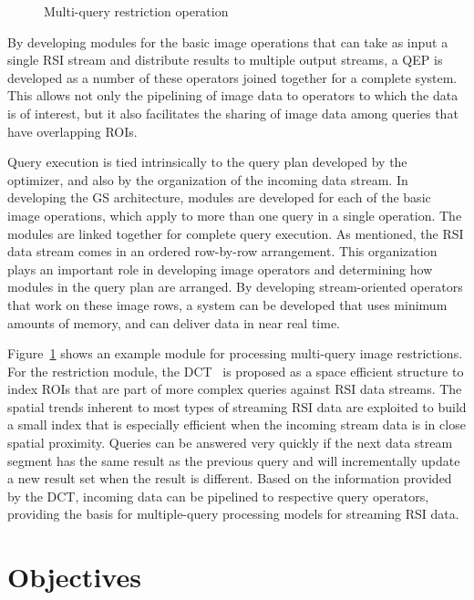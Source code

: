 \documentclass{ucdthesis}       %
\begin{document}
\begin{figure}[htb]
  \centering
  \scalebox{2}{}
  \caption{Multi-query restriction operation} 
\label{fig:query-eval}
\end{figure}

By developing modules for the basic image operations that can take as
input a single \ac{RSI} stream and distribute results to multiple
output streams, a \acf{QEP} is developed as a number of these
operators joined together for a complete system.  This allows not only
the pipelining of image data to operators to which the data is of
interest, but it also facilitates the sharing of image data among
queries that have overlapping \acp{ROI}.

Query execution is tied intrinsically to the query plan developed by
the optimizer, and also by the organization of the incoming data
stream.  In developing the \ac{GS} architecture, modules are developed
for each of the basic image operations, which apply to more than one
query in a single operation.  The modules are linked together for
complete query execution.  As mentioned, the \ac{RSI} data stream
comes in an ordered row-by-row arrangement.  This organization plays
an important role in developing image operators and determining how
modules in the query plan are arranged.  By developing stream-oriented
operators that work on these image rows, a system can be developed
that uses minimum amounts of memory, and can deliver data in near
real time.

Figure~\ref{fig:query-eval} shows an example module for processing
multi-query image restrictions.  For the restriction module, the
\acf{DCT}~\cite{hart04index-query,DBLP:conf/ssd/HartGZ05} is proposed
as a space efficient structure to index \acp{ROI} that are part of
more complex queries against \ac{RSI} data streams. The spatial trends
inherent to most types of streaming \acs{RSI} data are exploited to
build a small index that is especially efficient when the incoming
stream data is in close spatial proximity.  Queries can be answered
very quickly if the next data stream segment has the same result as
the previous query and will incrementally update a new result set when
the result is different.  Based on the information provided by the
\ac{DCT}, incoming data can be pipelined to respective query
operators, providing the basis for multiple-query processing models
for streaming RSI data.

\section{Objectives}
\end{document}
